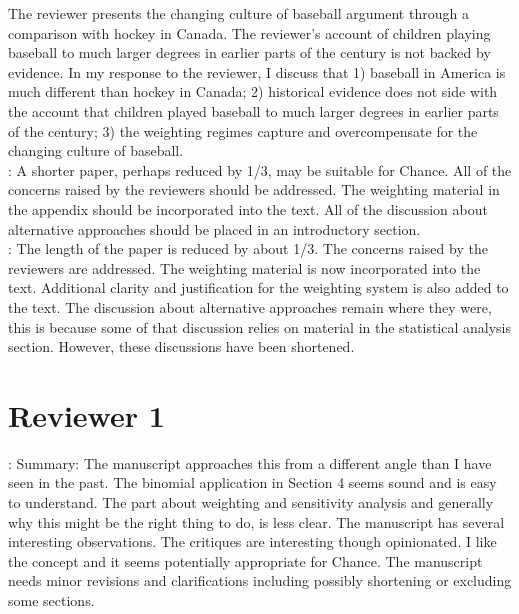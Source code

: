 \documentclass[11pt]{article}
\begin{document}
The reviewer presents the changing culture of baseball argument 
through a comparison with hockey in Canada.  The reviewer's account of 
children playing baseball to much larger degrees in earlier parts of the 
century is not backed by evidence.  In my response to the reviewer,  
I discuss that 
1) baseball in America is much different than hockey in Canada; 
2) historical evidence does not side with the account that children 
played baseball to much larger degrees in earlier parts of the century;
3) the weighting regimes capture and overcompensate for the changing 
culture of baseball. \\



:
A shorter paper, perhaps reduced by 1/3, may be suitable for Chance.  All of 
the concerns raised by the reviewers should be addressed.  The weighting 
material in the appendix should be incorporated into the text.  All of the 
discussion about alternative approaches should be placed in an introductory 
section. \\

: The length of the paper is reduced by about 1/3.  
The concerns raised by the reviewers are addressed.  The weighting material 
is now incorporated into the text.  Additional clarity and justification 
for the weighting system is also added to the text.  The discussion about 
alternative approaches remain where they were, this is because some of that 
discussion relies on material in the statistical analysis section.  However, 
these discussions have been shortened.  
 


\section*{Reviewer 1}

:
Summary: The manuscript approaches this from a different angle than I have 
seen in the past.  The binomial application in Section 4 seems sound and is 
easy to understand.  The part about weighting and sensitivity analysis and 
generally why this might be the right thing to do, is less clear.  The 
manuscript has several interesting observations.  The critiques are 
interesting though opinionated.  I like the concept and it seems potentially 
appropriate for Chance.  The manuscript needs minor revisions and 
clarifications including possibly shortening or excluding some sections. \\
\end{document}
